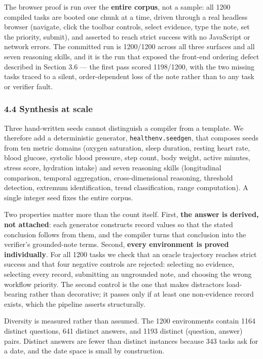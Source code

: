 \documentclass[
]{article}
\begin{document}
The browser proof is run over the \textbf{entire corpus}, not a sample:
all 1200 compiled tasks are booted one chunk at a time, driven through a
real headless browser (navigate, click the toolbar controls, select
evidence, type the note, set the priority, submit), and asserted to
reach strict success with no JavaScript or network errors. The committed
run is 1200/1200 across all three surfaces and all seven reasoning
skills, and it is the run that exposed the front-end ordering defect
described in Section 3.6 --- the first pass scored 1198/1200, with the
two missing tasks traced to a silent, order-dependent loss of the note
rather than to any task or verifier fault.

\subsubsection{4.4 Synthesis at scale}\label{synthesis-at-scale}

Three hand-written seeds cannot distinguish a compiler from a template.
We therefore add a deterministic generator, \texttt{healthenv.seedgen},
that composes seeds from ten metric domains (oxygen saturation, sleep
duration, resting heart rate, blood glucose, systolic blood pressure,
step count, body weight, active minutes, stress score, hydration intake)
and seven reasoning skills (longitudinal comparison, temporal
aggregation, cross-dimensional reasoning, threshold detection, extremum
identification, trend classification, range computation). A single
integer seed fixes the entire corpus.

Two properties matter more than the count itself. First, \textbf{the
answer is derived, not attached}: each generator constructs record
values so that the stated conclusion follows from them, and the compiler
turns that conclusion into the verifier's grounded-note terms. Second,
\textbf{every environment is proved individually}. For all 1200 tasks we
check that an oracle trajectory reaches strict success and that four
negative controls are rejected: selecting no evidence, selecting every
record, submitting an ungrounded note, and choosing the wrong workflow
priority. The second control is the one that makes distractors
load-bearing rather than decorative; it passes only if at least one
non-evidence record exists, which the pipeline asserts structurally.

Diversity is measured rather than assumed. The 1200 environments contain
1164 distinct questions, 641 distinct answers, and 1193 distinct
(question, answer) pairs. Distinct answers are fewer than distinct
instances because 343 tasks ask for a date, and the date space is small
by construction.
\end{document}
